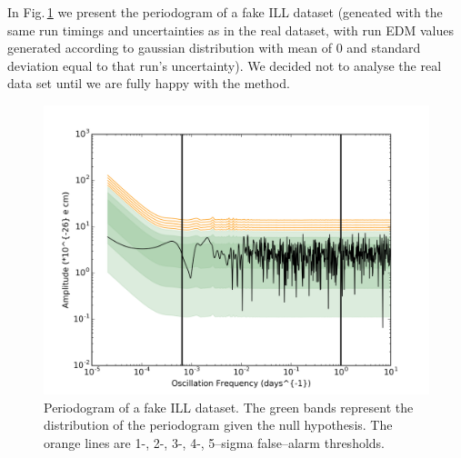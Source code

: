 In Fig.\,\ref{fig:ILL_detection} we present the periodogram of a fake ILL dataset (geneated with the same run timings and uncertainties as in the real dataset, with run EDM values generated according to gaussian distribution with mean of $0$ and standard deviation equal to that run's uncertainty). We decided not to analyse the real data set until we are fully happy with the method.

\begin{figure}[h!]
  \begin{center}
    \includegraphics[width=\columnwidth]{gfx/axions/ILL_detection_Periodogram.png}
    \caption{Periodogram of a fake ILL dataset. The green bands represent the distribution of the periodogram given the null hypothesis. The orange lines are 1-, 2-, 3-, 4-, 5--sigma false--alarm thresholds.}
    \label{fig:ILL_detection}
  \end{center}
\end{figure}




